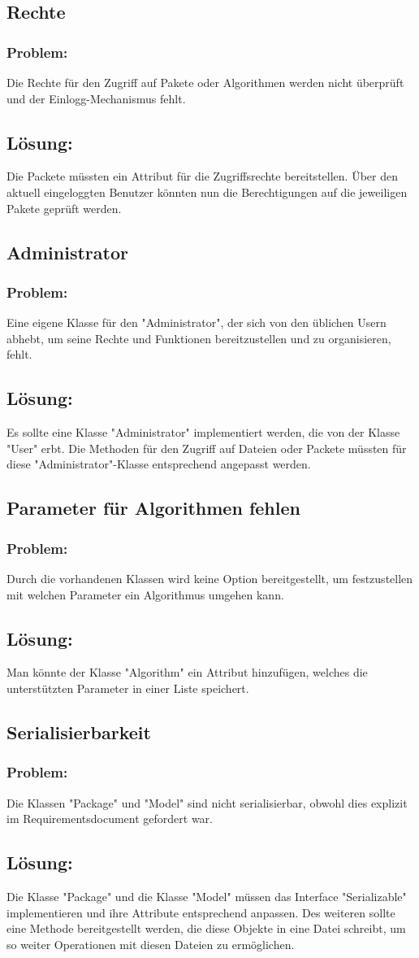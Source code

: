 \documentclass{article}
\newcommand{\RPS}[3]{\subsection{#1} \subsubsection*{Problem:} #2 \subsection*{Lösung:} #3}
\begin{document}
\RPS{Rechte}{%
	Die Rechte für den Zugriff auf Pakete oder Algorithmen werden nicht überprüft und der Einlogg-Mechanismus fehlt.%
}{%
Die Packete müssten ein Attribut für die Zugriffsrechte bereitstellen. Über den aktuell eingeloggten Benutzer könnten nun die Berechtigungen auf die jeweiligen Pakete geprüft werden.%
}

\RPS{Administrator}{%
	Eine eigene Klasse für den "Administrator", der sich von den üblichen Usern abhebt, um seine Rechte und Funktionen bereitzustellen und zu organisieren, fehlt.%
}{%
Es sollte eine Klasse "Administrator" implementiert werden, die von der Klasse "User" erbt. Die Methoden für den Zugriff auf Dateien oder Packete müssten für diese "Administrator"-Klasse entsprechend angepasst werden.%
}

\RPS{Parameter für Algorithmen fehlen}{%
Durch die vorhandenen Klassen wird keine Option bereitgestellt, um festzustellen mit welchen Parameter ein Algorithmus umgehen kann.%
}{%
Man könnte der Klasse "Algorithm" ein Attribut hinzufügen, welches die unterstützten Parameter in einer Liste speichert.%
}

\RPS{Serialisierbarkeit}{%
Die Klassen "Package" und "Model" sind nicht serialisierbar, obwohl dies explizit im Requirementsdocument gefordert war.
}{%
Die Klasse "Package" und die Klasse "Model" müssen das Interface "Serializable" implementieren und ihre Attribute entsprechend anpassen. Des weiteren sollte eine Methode bereitgestellt werden, die diese Objekte in eine Datei schreibt, um so weiter Operationen mit diesen Dateien zu ermöglichen.
}
\end{document}
